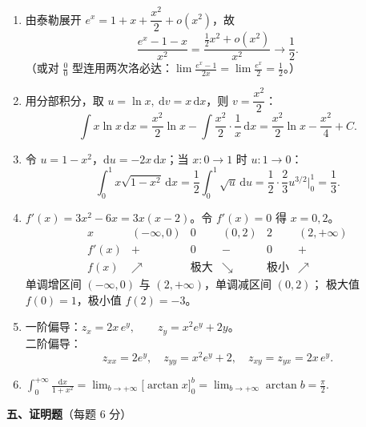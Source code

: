 \documentclass[12pt]{ctexart}
\theoremstyle{definition}
\begin{document}
\begin{enumerate}[label=\textbf{\arabic*.},itemsep=10pt]
\item 由泰勒展开 $e^{x}=1+x+\dfrac{x^{2}}{2}+o(x^{2})$，故
  \[
  \frac{e^{x}-1-x}{x^{2}}=\frac{\tfrac{1}{2}x^{2}+o(x^{2})}{x^{2}}\to\frac{1}{2}.
  \]
  （或对 $\frac{0}{0}$ 型连用两次洛必达：$\lim\frac{e^{x}-1}{2x}=\lim\frac{e^{x}}{2}=\tfrac12$。）

\item 用分部积分，取 $u=\ln x,\ \mathrm{d}v=x\,\mathrm{d}x$，则 $v=\dfrac{x^{2}}{2}$：
  \[
  \int x\ln x\,\mathrm{d}x=\frac{x^{2}}{2}\ln x-\int\frac{x^{2}}{2}\cdot\frac{1}{x}\,\mathrm{d}x
  =\frac{x^{2}}{2}\ln x-\frac{x^{2}}{4}+C .
  \]

\item 令 $u=1-x^{2}$，$\mathrm{d}u=-2x\,\mathrm{d}x$；当 $x:0\to1$ 时 $u:1\to0$：
  \[
  \int_{0}^{1}x\sqrt{1-x^{2}}\,\mathrm{d}x
  =\frac12\int_{0}^{1}\sqrt{u}\,\mathrm{d}u
  =\frac12\cdot\frac{2}{3}u^{3/2}\Big|_{0}^{1}=\frac{1}{3}.
  \]

\item $f'(x)=3x^{2}-6x=3x(x-2)$。令 $f'(x)=0$ 得 $x=0,2$。
  \[
  \begin{array}{c|ccccc}
   x & (-\infty,0) & 0 & (0,2) & 2 & (2,+\infty)\\\hline
   f'(x) & + & 0 & - & 0 & +\\
   f(x) & \nearrow & \text{极大} & \searrow & \text{极小} & \nearrow
  \end{array}
  \]
  单调增区间 $(-\infty,0)$ 与 $(2,+\infty)$，单调减区间 $(0,2)$；
  极大值 $f(0)=1$，极小值 $f(2)=-3$。

\item 一阶偏导：$z_{x}=2x\,e^{y},\qquad z_{y}=x^{2}e^{y}+2y$。\\
  二阶偏导：
  \[
  z_{xx}=2e^{y},\quad z_{yy}=x^{2}e^{y}+2,\quad z_{xy}=z_{yx}=2x\,e^{y}.
  \]

\item $\displaystyle\int_{0}^{+\infty}\frac{\mathrm{d}x}{1+x^{2}}
  =\lim_{b\to+\infty}\big[\arctan x\big]_{0}^{b}
  =\lim_{b\to+\infty}\arctan b=\frac{\pi}{2}.$
\end{enumerate}

\vspace{6pt}
\noindent\textbf{五、证明题}（每题 6 分）
\end{document}
